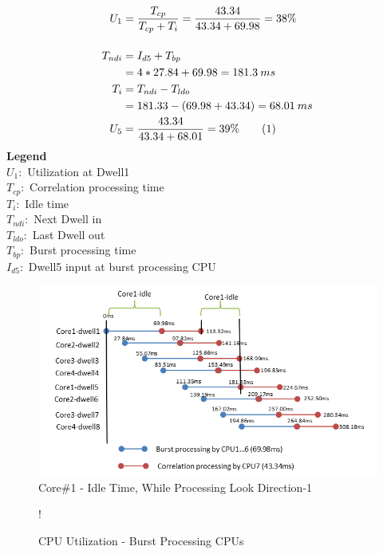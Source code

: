 \begin{align*}
	U_{1} &= \frac{T_{cp}}{ T_{cp} + T_{i}} = \frac{43.34}{43.34 + 69.98} = 38\% \\[0.4cm]
	T_{ndi} &= I_{d5} + T_{bp} \\
	&= 4 * 27.84 + 69.98 =181.3 \: ms\\
	T_{i} &= T_{ndi} - T_{ldo} \\
	&= 181.33 - (69.98 + 43.34) = 68.01 \: ms \\
	U_{5} &= \frac{43.34}{43.34 + 68.01} = 39\%  \stepcounter{equation}\tag{\theequation}
\end{align*}
\noindent 
\textbf{Legend}\\
\tab $U_{1}:$ Utilization at Dwell1 \\
\tab $T_{cp}:$ Correlation processing time \\
\tab $T_{i}:$ Idle time \\
\tab $T_{ndi}:$ Next Dwell in \\
\tab $T_{ldo}:$ Last Dwell out \\
\tab $T_{bp}:$ Burst processing time \\
\tab $I_{d5}:$ Dwell5 input at burst processing CPU 

\begin{figure}[h!]
	\centering
	\includegraphics[width=160mm]{figures/scheme4_corr_timeline}
	\caption{Core\#1 - Idle Time, While Processing Look Direction-1 }
	\label{fig:mm:scheme4_corr_cpu_util_pic}
\end{figure}

\begin{figure}[h!]
\centering
\resizebox {10cm} {!} {
}
\caption{CPU Utilization - Burst Processing CPUs}
\label{sch3:chrt:corr_cpu_util}
\end{figure}

